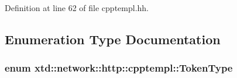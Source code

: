 Definition at line 62 of file cpptempl.\+hh.



\subsection{Enumeration Type Documentation}
\subsubsection[{\texorpdfstring{Token\+Type}{TokenType}}]{\setlength{\rightskip}{0pt plus 5cm}enum {\bf xtd\+::network\+::http\+::cpptempl\+::\+Token\+Type}}\hypertarget{namespacextd_1_1network_1_1http_1_1cpptempl_a39833083d228a5b5ef9f6bb7896479ee}{}\label{namespacextd_1_1network_1_1http_1_1cpptempl_a39833083d228a5b5ef9f6bb7896479ee}
